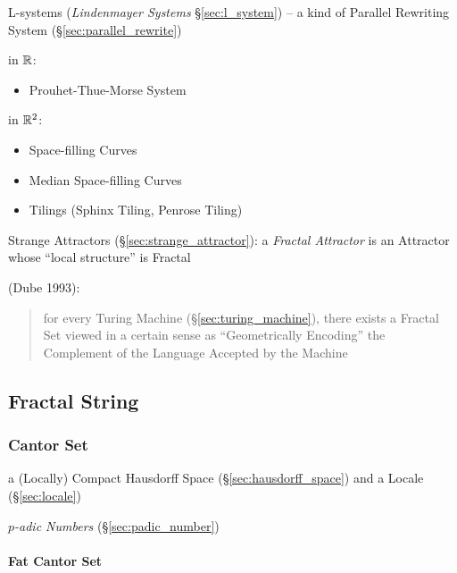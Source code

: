 \asterism

L-systems (\emph{Lindenmayer Systems} \S\ref{sec:l_system}) -- a kind of
Parallel Rewriting System (\S\ref{sec:parallel_rewrite})


in $\mathbb{R}$:
\begin{itemize}
  \item Prouhet-Thue-Morse System
\end{itemize}

in $\mathbb{R}^2$:
\begin{itemize}
  \item Space-filling Curves
  \item Median Space-filling Curves
  \item Tilings (Sphinx Tiling, Penrose Tiling)
\end{itemize}

\fist Strange Attractors (\S\ref{sec:strange_attractor}): a \emph{Fractal
  Attractor} is an Attractor whose ``local structure'' is Fractal

\asterism

(Dube 1993):
\begin{quote}
  for every Turing Machine (\S\ref{sec:turing_machine}), there exists a Fractal
  Set viewed in a certain sense as ``Geometrically Encoding'' the Complement of
  the Language Accepted by the Machine
\end{quote}



\subsection{Fractal String}\label{sec:fractal_string}

\subsubsection{Cantor Set}\label{sec:cantor_set}

a (Locally) Compact Hausdorff Space (\S\ref{sec:hausdorff_space}) and a Locale
(\S\ref{sec:locale})

\emph{$p$-adic Numbers} (\S\ref{sec:padic_number})



\paragraph{Fat Cantor Set}\label{sec:fat_cantor_set}\hfill

